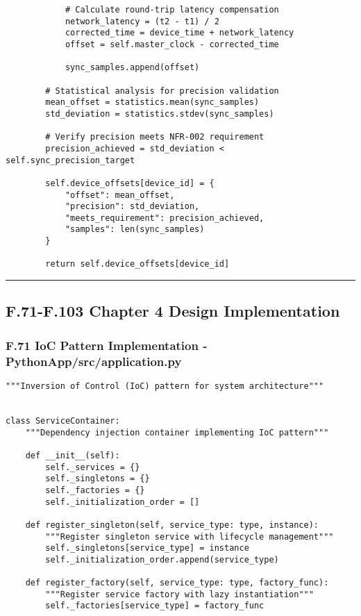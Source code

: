 \documentclass[12pt,a4paper]{report}
\begin{document}
{{\begin{verbatim}
            # Calculate round-trip latency compensation
            network_latency = (t2 - t1) / 2
            corrected_time = device_time + network_latency
            offset = self.master_clock - corrected_time

            sync_samples.append(offset)

        # Statistical analysis for precision validation
        mean_offset = statistics.mean(sync_samples)
        std_deviation = statistics.stdev(sync_samples)

        # Verify precision meets NFR-002 requirement
        precision_achieved = std_deviation < self.sync_precision_target

        self.device_offsets[device_id] = {
            "offset": mean_offset,
            "precision": std_deviation,
            "meets_requirement": precision_achieved,
            "samples": len(sync_samples)
        }

        return self.device_offsets[device_id]
\end{verbatim}

\hrule

\subsection{F.71-F.103 Chapter 4 Design Implementation}

\subsubsection{F.71 IoC Pattern Implementation - PythonApp/src/application.py}

\begin{verbatim}
"""Inversion of Control (IoC) pattern for system architecture"""


class ServiceContainer:
    """Dependency injection container implementing IoC pattern"""

    def __init__(self):
        self._services = {}
        self._singletons = {}
        self._factories = {}
        self._initialization_order = []

    def register_singleton(self, service_type: type, instance):
        """Register singleton service with lifecycle management"""
        self._singletons[service_type] = instance
        self._initialization_order.append(service_type)

    def register_factory(self, service_type: type, factory_func):
        """Register service factory with lazy instantiation"""
        self._factories[service_type] = factory_func


\end{verbatim}}}
\end{document}
